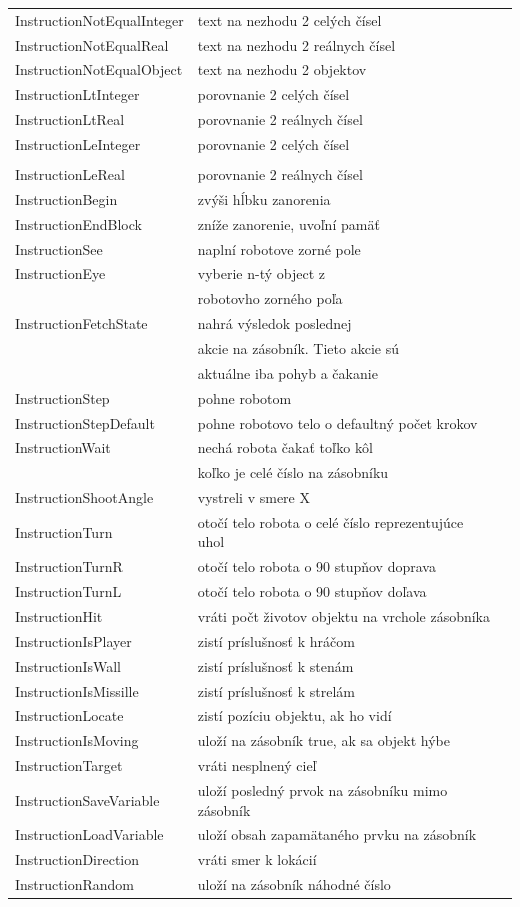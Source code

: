 \begin{center}
\begin{longtable}{|l|l|l|}
InstructionNotEqualInteger&text na nezhodu 2 celých čísel\\
InstructionNotEqualReal&text na nezhodu 2 reálnych čísel\\
InstructionNotEqualObject&text na nezhodu 2 objektov\\
InstructionLtInteger&porovnanie 2 celých čísel\\
InstructionLtReal&porovnanie 2 reálnych čísel\\
InstructionLeInteger&porovnanie 2 celých čísel\\\\
InstructionLeReal&porovnanie 2 reálnych čísel\\
InstructionBegin& zvýši hĺbku zanorenia\\
InstructionEndBlock& zníže zanorenie, uvoľní pamäť\\
InstructionSee& naplní robotove zorné pole\\
InstructionEye& vyberie n-tý object z \\
&robotovho zorného poľa\\
InstructionFetchState& nahrá výsledok poslednej \\
&akcie na zásobník. Tieto akcie sú \\
&aktuálne iba pohyb a čakanie\\
InstructionStep& pohne robotom\\
InstructionStepDefault& pohne robotovo telo o defaultný počet krokov\\
InstructionWait& nechá robota čakať toľko kôl\\
& koľko je celé číslo na zásobníku\\
InstructionShootAngle& vystreli v smere X\\
InstructionTurn& otočí telo robota o celé číslo reprezentujúce uhol \\
InstructionTurnR& otočí telo robota o 90 stupňov doprava\\
InstructionTurnL& otočí telo robota o 90 stupňov doľava\\
InstructionHit& vráti počt životov objektu na vrchole zásobníka\\
InstructionIsPlayer& zistí príslušnosť k hráčom\\
InstructionIsWall& zistí príslušnosť k stenám\\
InstructionIsMissille& zistí príslušnosť k strelám\\
InstructionLocate& zistí pozíciu objektu, ak ho vidí\\
InstructionIsMoving& uloží na zásobník true, ak sa objekt hýbe\\
InstructionTarget& vráti nesplnený cieľ\\
InstructionSaveVariable& uloží posledný prvok na zásobníku mimo zásobník\\
InstructionLoadVariable& uloží obsah zapamätaného prvku na zásobník \\
InstructionDirection& vráti smer k lokácií\\
InstructionRandom& uloží na zásobník náhodné číslo\\
\hline
\end{longtable}
\end{center}
